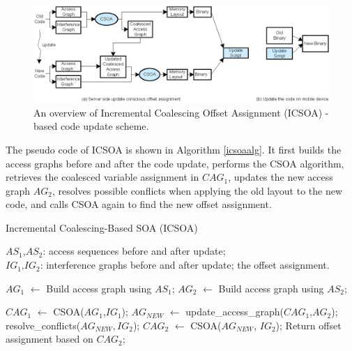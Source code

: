\begin{figure}[htbp]
\begin{center}
\includegraphics[scale=1.2]{./figures/icsoa-overview.eps}
\caption{An overview of Incremental Coalescing Offset Assignment (ICSOA) -based code update scheme.}
\label{ioverview}
\end{center}
\end{figure}


The pseudo code of ICSOA is shown in Algorithm \ref{icsoaalg}. It first builds the access graphs before and after the code update, performs the CSOA algorithm, retrieves the coalesced variable assignment in $\textit{CAG}_1$, updates the new access graph $\textit{AG}_2$, resolves possible conflicts when applying the old layout to the new code, and calls CSOA again to find the new offset assignment. 

\begin{algorithm}
\caption{Incremental Coalescing-Based SOA (ICSOA)}
\singlespace
\label{icsoaalg}
\begin{algorithmic}[1]
\singlespace
\REQUIRE $\textit{AS}_1$,$\textit{AS}_2$: access sequences before and after update; \\
				 $\textit{IG}_1$,$\textit{IG}_2$: interference graphs before and after update;
\ENSURE the offset assignment.

\STATE $\textit{AG}_1$ $\leftarrow$ Build access graph using $\textit{AS}_1$;
\STATE $\textit{AG}_2$ $\leftarrow$ Build access graph using $\textit{AS}_2$;

\STATE $\textit{CAG}_1$ $\leftarrow$ CSOA($\textit{AG}_1$,$\textit{IG}_1$); 
\STATE $\textit{AG}_\textit{NEW}$ $\leftarrow$ update\_access\_graph($\textit{CAG}_1$,$\textit{AG}_2$); 
\STATE resolve\_conflicts($\textit{AG}_\textit{NEW},\textit{IG}_2$); 
\STATE $\textit{CAG}_2$ $\leftarrow$ CSOA($\textit{AG}_\textit{NEW}$, $\textit{IG}_2$);
\STATE Return offset assignment based on $\textit{CAG}_2$;
\end{algorithmic}
\end{algorithm}

